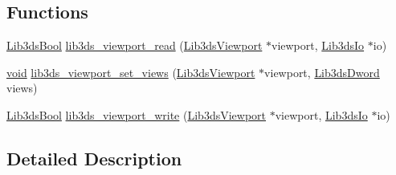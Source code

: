 \subsection*{Functions}
\begin{DoxyCompactItemize}
\item 
\hyperlink{types_8h_a89dd7398a9ebbbf28011f8c32df67ad3}{Lib3ds\-Bool} \hyperlink{group__viewport_gab5837a8b50894283191b6019d4f98ad8}{lib3ds\-\_\-viewport\-\_\-read} (\hyperlink{struct_lib3ds_viewport}{Lib3ds\-Viewport} $\ast$viewport, \hyperlink{struct_lib3ds_io}{Lib3ds\-Io} $\ast$io)
\item 
\hyperlink{group___u_a_v_objects_plugin_ga444cf2ff3f0ecbe028adce838d373f5c}{void} \hyperlink{group__viewport_ga705b2bc61484b169f950468b702ebdce}{lib3ds\-\_\-viewport\-\_\-set\-\_\-views} (\hyperlink{struct_lib3ds_viewport}{Lib3ds\-Viewport} $\ast$viewport, \hyperlink{types_8h_a299c9663303144c562f6bd92c2f273d3}{Lib3ds\-Dword} views)
\item 
\hyperlink{types_8h_a89dd7398a9ebbbf28011f8c32df67ad3}{Lib3ds\-Bool} \hyperlink{group__viewport_gac5d04d7287c0c3fbbdbf43c2605b1960}{lib3ds\-\_\-viewport\-\_\-write} (\hyperlink{struct_lib3ds_viewport}{Lib3ds\-Viewport} $\ast$viewport, \hyperlink{struct_lib3ds_io}{Lib3ds\-Io} $\ast$io)
\end{DoxyCompactItemize}


\subsection{Detailed Description}


